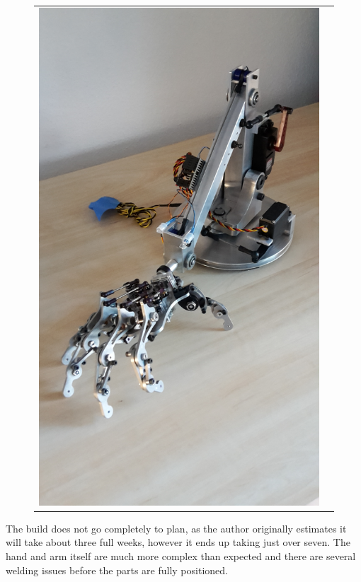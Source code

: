 \documentclass[progress]{cmpreport}
\begin{document}
\begin{figure}[H]
\begin{tabular}{ll}
		\includegraphics[trim=10cm 2cm 3cm 4cm, clip=true, totalheight=0.28\textheight, angle=-90]{photos/Day42-pt5.jpg}
	\end{tabular}
\end{figure}

The build does not go completely to plan, as the author originally estimates it will take about three full weeks, however it ends up taking just over seven. The hand and arm itself are much more complex than expected and there are several welding issues before the parts are fully positioned. 
\end{document}
